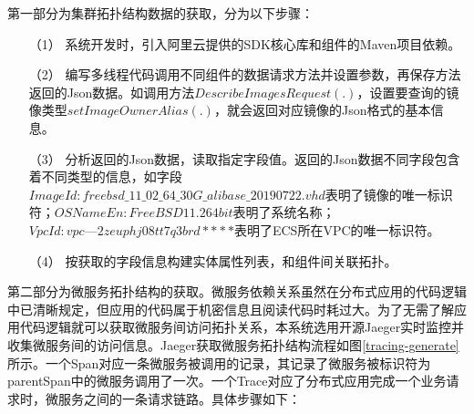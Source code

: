第一部分为集群拓扑结构数据的获取，分为以下步骤：
\begin{itemize}
    \item [（1）]系统开发时，引入阿里云提供的SDK核心库和组件的Maven项目依赖。
    \item [（2）]编写多线程代码调用不同组件的数据请求方法并设置参数，再保存方法返回的Json数据。如调用方法$DescribeImagesRequest(.)$，设置要查询的镜像类型$setImageOwnerAlias(.)$，就会返回对应镜像的Json格式的基本信息。
    \item [（3）]分析返回的Json数据，读取指定字段值。返回的Json数据不同字段包含着不同类型的信息，如字段$ ImageId: freebsd\_11\_02\_64\_30G\_alibase\_20190722.vhd$表明了镜像的唯一标识符；$OSNameEn: FreeBSD  11.2 64 bit$表明了系统名称；$VpcId:vpc—2zeuphj08tt7q3brd****$表明了ECS所在VPC的唯一标识符。
    \item [（4）]按获取的字段信息构建实体属性列表，和组件间关联拓扑。
\end{itemize}

第二部分为微服务拓扑结构的获取。微服务依赖关系虽然在分布式应用的代码逻辑中已清晰规定，但应用的代码属于机密信息且阅读代码时耗过大。为了无需了解应用代码逻辑就可以获取微服务间访问拓扑关系，本系统选用开源Jaeger实时监控并收集微服务间的访问信息。Jaeger获取微服务拓扑结构流程如图\ref{tracing-generate}所示。一个Span对应一条微服务被调用的记录，其记录了微服务被标识符为parentSpan中的微服务调用了一次。一个Trace对应了分布式应用完成一个业务请求时，微服务之间的一条请求链路。具体步骤如下：


